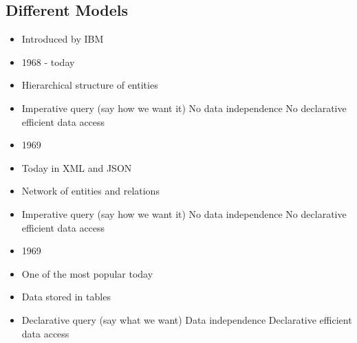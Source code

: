 \subsection{Different Models}
\begin{itemize}
        \begin{itemize}
            \item Introduced by IBM
            \item 1968 - today
            \item Hierarchical structure of entities
            \item Imperative query (say how we want it)
            \icon No data independence
            \icon No declarative efficient data access
        \end{itemize}
        \begin{itemize}
            \item 1969
            \item Today in XML and JSON
            \item Network of entities and relations
            \item Imperative query (say how we want it)
            \icon No data independence
            \icon No declarative efficient data access
        \end{itemize}
        \begin{itemize}
            \item 1969
            \item One of the most popular today
            \item Data stored in tables
            \item Declarative query (say what we want)
            \ipro Data independence
            \ipro Declarative efficient data access
        \end{itemize}
\end{itemize}
